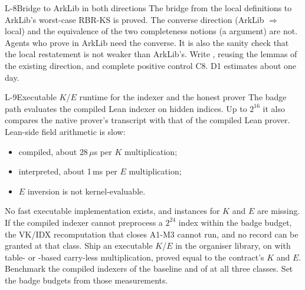 \begin{issue}{L-8}{Bridge to ArkLib in both directions}
\IRprob The bridge from the local definitions to ArkLib's worst-case RBR-KS is proved. The
converse direction (ArkLib $\Rightarrow$ local) and the equivalence of the two completeness
notions (a  argument) are not.
\IRwhy Agents who prove in ArkLib need the converse. It is also the sanity check that the local
restatement is not weaker than ArkLib's.
\IRres Write , reusing the lemmas of the existing direction, and complete
positive control C8. D1 estimates about one day.
\end{issue}

\begin{issue}{L-9}{Executable \texorpdfstring{$K$/$E$}{K/E} runtime for the indexer and the honest prover}
\IRprob The badge path evaluates the compiled Lean indexer on hidden indices. Up to $2^{16}$ it also
compares the native prover's transcript with that of the compiled Lean prover. Lean-side field
arithmetic is slow:
\begin{itemize}[nosep]
\item compiled, about $28\,\mu$s per $K$ multiplication;
\item interpreted, about 1\,ms per $E$ multiplication;
\item $E$ inversion is not kernel-evaluable.
\end{itemize}
No fast executable implementation exists, and  instances for $K$ and $E$ are
missing.
\IRwhy If the compiled indexer cannot preprocess a $2^{24}$ index within the badge budget, the
VK/IDX recomputation that closes A1-M3 cannot run, and no record can be granted at that class.
\IRres Ship an executable $K$/$E$ in the organiser library, on  with table- or
-based carry-less multiplication, proved equal to the contract's $K$ and $E$. Benchmark
the compiled indexers of the baseline and of  at all three classes. Set the badge budgets
from those measurements.
\end{issue}

